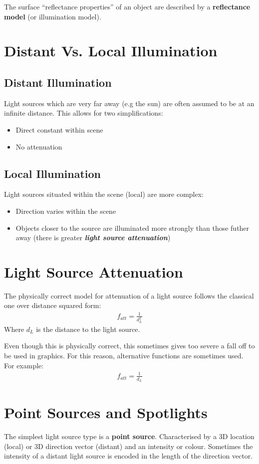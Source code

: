 \documentclass{article}
\begin{document}
The surface ``reflectance properties'' of an object are described by a {\bf reflectance} {\bf model} (or illumination model). 

\section{Distant Vs. Local Illumination}
\subsection{Distant Illumination}
Light sources which are very far away (e.g the sun) are often assumed to be at an infinite distance.
This allows for two simplifications:
\begin{itemize}
	\item Direct constant within scene
	\item No attenuation
\end{itemize}
\subsection{Local Illumination}
Light sources situated within the scene (local) are more complex:
\begin{itemize}
	\item Direction varies within the scene
	\item Objects closer to the source are illuminated more strongly than those futher away (there is greater {\textbf {\textit {light source attenuation}}})
\end{itemize}

\section{Light Source Attenuation}
The physically correct model for attenuation of a light source follows the classical one over distance squared form:
\begin{align*}
	f_{att} = \frac{1}{d^2_L}
\end{align*}
Where $d_L$ is the distance to the light source.

Even though this is physically correct, this sometimes gives too severe a fall off to be used in graphics.
For this reason, alternative functions are sometimes used.
For example:
\begin{align*}
	f_{att} = \frac{1}{d_L}
\end{align*}

\section{Point Sources and Spotlights}
The simplest light source type is a {\bf point source}.
Characterised by a 3D location (local) or 3D direction vector (distant) and an intensity or colour.
Sometimes the intensity of a distant light source is encoded in the length of the direction vector.
\end{document}
